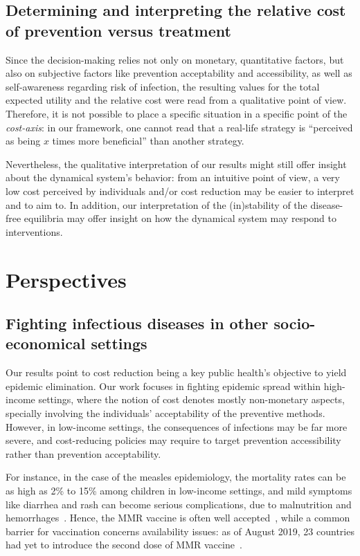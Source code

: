 
\subsection{Determining and interpreting the relative cost of prevention versus treatment}
Since the decision-making relies not only on monetary, quantitative factors, but also on subjective factors like prevention acceptability and accessibility, as well as self-awareness regarding risk of infection, the resulting values for the total expected utility and the relative cost were read from a qualitative point of view. 
%
Therefore, it is not possible to place a specific situation in a specific point of the {\it cost-axis}: in our framework, one cannot read that a real-life strategy is ``perceived as being $x$ times more beneficial'' than another strategy. 

Nevertheless, the qualitative interpretation of our results might still offer insight about the dynamical system's behavior: from an intuitive point of view, a very low cost perceived by individuals and/or cost reduction may be easier to interpret and to aim to. In addition, our interpretation of the (in)stability of the disease-free equilibria may offer insight on how the dynamical system may respond to interventions. 


\section{Perspectives}

\subsection{Fighting infectious diseases in other socio-economical settings}
Our results point to cost reduction being a key public health's objective to yield epidemic elimination. Our work focuses in fighting epidemic spread within high-income settings, where the notion of cost denotes mostly non-monetary aspects, specially involving the individuals' acceptability of the preventive methods. However, in low-income settings, the consequences of infections may be far more severe, and cost-reducing policies may require to target prevention accessibility rather than prevention acceptability. 

For instance, in the case of the measles epidemiology, the mortality rates can be as high as 2\% to 15\% among children in low-income settings, and mild symptoms like diarrhea and rash can become serious complications, due to malnutrition and hemorrhages~\cite[]{Sever2011}. Hence, the MMR vaccine is often well accepted~\cite[]{Larson2016}, while a common barrier for vaccination concerns availability issues: as of August 2019, 23 countries had yet to introduce the second dose of MMR vaccine~\cite[]{WHO_MeaslesWW2019}. 

